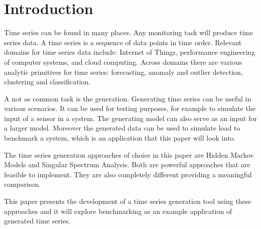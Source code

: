 
\chapter{Introduction}\label{chapter:introduction}

Time series can be found in many places. Any monitoring task will produce time series data.  A time series is a sequence of data points in time order.  Relevant domains for time series data include:  Internet of Things,  performance engineering of computer systems, and cloud computing. Across domains there are various analytic primitives for time series: forecasting, anomaly and outlier detection, clustering and classification.

A not as common task is the generation. Generating time series can be useful in various scenarios. It can be used for testing purposes, for example to simulate the input of a sensor in a system. The generating model can also serve as an input for a larger model. Moreover the generated data can be used to simulate load to benchmark a system, which is an application that this paper will look into. 

The time series generation approaches of choice in this paper are Hidden Markov Models and Singular Spectrum Analysis. Both are powerful approaches that are feasible to implement. They are also completely different providing a meaningful comparison. 

This paper presents the development of a time series generation tool using these approaches and it will explore benchmarking as an example application of generated time series. 